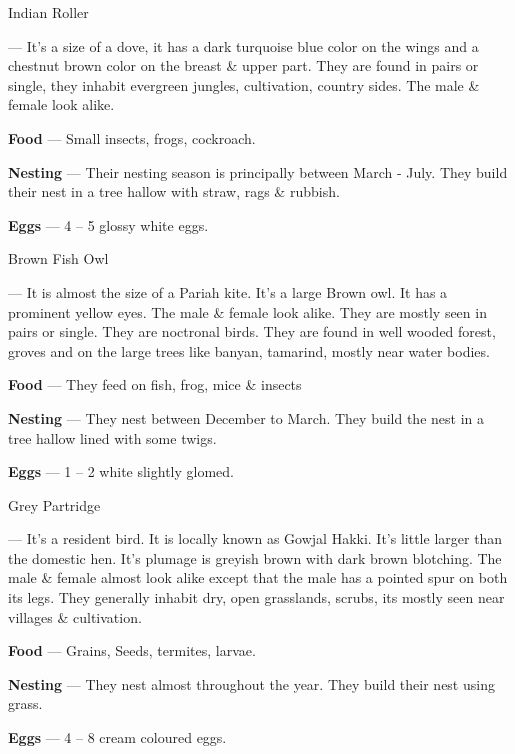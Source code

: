 \begin{bird}{Indian Roller}

 --- It's a size of a dove, it has a dark turquoise blue color on the wings and a chestnut brown color on the breast \& upper part. They are found in pairs or single, they inhabit evergreen jungles, cultivation, country sides. The male \& female look alike. 

{\large\bf Food} --- Small insects, frogs, cockroach.

{\large\bf Nesting} --- Their nesting season is principally between March - July. They build their nest in a tree hallow with straw, rags \& rubbish.

{\large\bf Eggs} --- 4 -- 5 glossy white eggs. 
\end{bird}

\begin{bird}{Brown Fish Owl}

 --- It is almost the size of a Pariah kite. It's a large Brown owl. It has a prominent yellow eyes. The male \& female look alike. They are mostly seen in pairs or single. They are noctronal birds. They are found in well wooded  forest, groves and on the large trees like banyan, tamarind, mostly near water bodies.

{\large\bf Food} --- They feed on fish, frog, mice \& insects

{\large\bf Nesting} --- They nest between December to March. They build the nest in a tree hallow lined with some twigs.

{\large\bf Eggs} --- 1 -- 2 white slightly glomed.
\end{bird}

\begin{bird}{Grey Partridge}

 --- It's a resident bird. It is locally known as Gowjal Hakki. It's little larger than the domestic hen. It's plumage is greyish brown with dark brown blotching. The male \& female almost look alike except that the male has a pointed spur on both its legs. They generally inhabit dry, open grasslands, scrubs, its mostly seen near villages \& cultivation.

{\large\bf Food} --- Grains, Seeds, termites, larvae.

{\large\bf Nesting} --- They nest almost throughout the year. They build their nest using grass.

{\large\bf Eggs} --- 4 -- 8 cream coloured eggs.
\end{bird}


